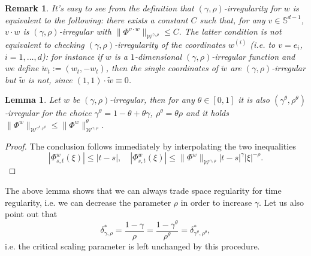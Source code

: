 \documentclass[10pt]{article}
\newcommand{\assign}{:=}
\newtheorem{lemma}[theorem]{Lemma}
\newtheorem{remark}[theorem]{Remark}
\begin{document}
\begin{remark}
  It's easy to see from the definition that $(\gamma,
  \rho)$\mbox{-}irregularity for $w$ is equivalent to the following: there
  exists a constant $C$ such that, for any $v \in \mathbb{S}^{d - 1}$, $v
  \cdot w$ is $(\gamma, \rho)$\mbox{-}irregular with $\| \Phi^{v \cdot w}
  \|_{\mathcal{W}^{\gamma, \rho}} \leqslant C.$ The latter condition is not
  equivalent to checking $(\gamma, \rho)$\mbox{-}irregularity of the
  coordinates $w^{(i)}$ (i.e. to $v = e_i$, $i = 1, \ldots, d$): for instance
  if $w$ is a $1$\mbox{-}dimensional $(\gamma, \rho)$-irregular function and
  we define $\tilde{w}_t \assign (w_t, - w_t)$, then the single coordinates of
  $\tilde{w}$ are $(\gamma, \rho)$-irregular but $\tilde{w}$ is not, since
  $(1, 1) \cdot \tilde{w} \equiv 0$.
\end{remark}

\begin{lemma}
  \label{sec2.2 lemma interpolation rho irr}Let $w$ be $(\gamma,
  \rho)$\mbox{-}irregular, then for any $\theta \in [0, 1]$ it is also
  $(\gamma^{\theta}, \rho^{\theta})$\mbox{-}irregular for the choice
  $\gamma^{\theta} = 1 - \theta + \theta \gamma$, $\rho^{\theta} = \theta
  \rho$ and it holds $\| \Phi^w \|_{\mathcal{W}^{\gamma^{\theta},
  \rho^{\theta}}} \leqslant \| \Phi^w \|^{\theta}_{\mathcal{W}^{\gamma,
  \rho}}$.
\end{lemma}

\begin{proof}
The conclusion follows immediately by interpolating the two inequalities
%
\begin{equation*}
| \Phi^w_{s, t} (\xi) | \leqslant | t - s |, \quad | \Phi^w_{s, t} (\xi)
     | \leqslant \| \Phi^w \|_{\mathcal{W}^{\gamma, \rho}} | t - s |^{\gamma}
     | \xi |^{- \rho} .
\end{equation*}
\end{proof}

The above lemma shows that we can always trade space regularity for time
regularity, i.e. we can decrease the parameter $\rho$ in order to increase
$\gamma$. Let us also point out that
\begin{equation}
  \delta^{\ast}_{\gamma, \rho} = \frac{1 - \gamma}{\rho} = \frac{1 -
  \gamma^{\theta}}{\rho^{\theta}} = \delta^{\ast}_{\gamma^{\theta},
  \rho^{\theta}}, \label{eq:critical-parameter}
\end{equation}
i.e. the critical scaling parameter is left unchanged by this procedure.

\
\end{document}
